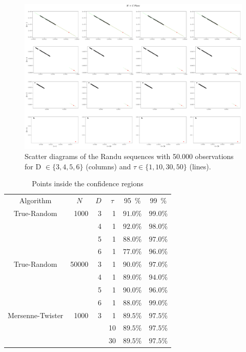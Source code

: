 \documentclass[12pt]{article}
\begin{document}
\begin{description}
	\begin{figure}[H]
	\includegraphics[width=\linewidth]{../../Images/PRNGs/Randu-50000.pdf}
	\caption{Scatter diagrams of the Randu sequences with 50.000 observations for D $\in \{3,4,5,6\}$ (columns) and $\tau \in \{1,10,30,50\}$ (lines).}
	\end{figure}
	\begin{table}[!h]
	\centering
	\caption{Points inside the confidence regions}
	\label{tab:result1}
	\begin{tabular}{c*{5}r}
		\toprule
		Algorithm & \multicolumn{1}{c}{$N$} & \multicolumn{1}{c}{$D$} & \multicolumn{1}{c}{$\tau$} & \multicolumn{1}{c}{\SI{95}{\percent}} & \multicolumn{1}{c}{\SI{99}{\percent}}\\
		\cmidrule(lr){1-1}
		\cmidrule(lr){2-2}
		\cmidrule(lr){3-3}
		\cmidrule(lr){4-4}
		\cmidrule(lr){5-5}
		\cmidrule(lr){6-6}
		True-Random & 1000 & 3 & 1 & $91.0\%$ & $99.0\%$\\
		&  & 4 & 1 & $92.0\%$ & $98.0\%$\\
		&  & 5 & 1 & $88.0\%$ & $97.0\%$\\
		&  & 6 & 1 & $77.0\%$ & $96.0\%$\\
		\cmidrule(lr){1-6}
		True-Random & 50000 & 3 & 1 & $90.0\%$ & $97.0\%$\\
		&  & 4 & 1 & $89.0\%$ & $94.0\%$\\
		&  & 5 & 1 & $90.0\%$ & $96.0\%$\\
		&  & 6 & 1 & $88.0\%$ & $99.0\%$\\
		\cmidrule(lr){1-6}
		Mersenne-Twister & 1000 & 3 & 1 & $89.5\%$ & $97.5\%$\\
		 &  &  & 10 & $89.5\%$ & $97.5\%$\\
		 &  &  & 30 & $89.5\%$ & $97.5\%$\\

\end{tabular}
\end{table}
\end{description}
\end{document}
